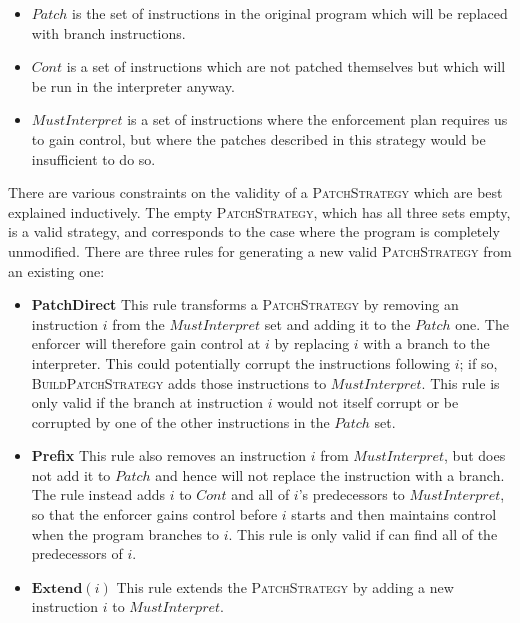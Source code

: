\begin{itemize}
\item $\mathit{Patch}$ is the set of instructions in the original
  program which will be replaced with branch instructions.
\item $\mathit{Cont}$ is a set of instructions which are not patched
  themselves but which will be run in the interpreter anyway.
\item $\mathit{MustInterpret}$ is a set of instructions where the
  enforcement plan requires us to gain control, but where the patches
  described in this strategy would be insufficient to do so.
\end{itemize}

There are various constraints on the validity of a
\textsc{PatchStrategy} which are best explained inductively.  The
empty \textsc{PatchStrategy}, which has all three sets empty, is a
valid strategy, and corresponds to the case where the program is
completely unmodified.  There are three rules for generating a new
valid \textsc{PatchStrategy} from an existing one:

\begin{itemize}
\item
  \textbf{PatchDirect} This rule transforms a \textsc{PatchStrategy}
  by removing an instruction $i$ from the $\mathit{MustInterpret}$ set
  and adding it to the $\mathit{Patch}$ one.  The enforcer will
  therefore gain control at $i$ by replacing $i$ with a branch to the
  interpreter.  This could potentially corrupt the instructions
  following $i$; if so, \textsc{BuildPatchStrategy} adds those
  instructions to $\mathit{MustInterpret}$.  This rule is only valid
  if the branch at instruction $i$ would not itself corrupt or be
  corrupted by one of the other instructions in the $\mathit{Patch}$
  set.
\item
  \textbf{Prefix} This rule also removes an instruction $i$ from
  $\mathit{MustInterpret}$, but does not add it to $\mathit{Patch}$
  and hence will not replace the instruction with a branch.  The rule
  instead adds $i$ to $\mathit{Cont}$ and all of $i$'s predecessors to
  $\mathit{MustInterpret}$, so that the enforcer gains control before
  $i$ starts and then maintains control when the program branches to
  $i$.  This rule is only valid if {\technique} can find all of the
  predecessors of $i$.
\item
  $\textbf{Extend}(i)$ This rule extends the \textsc{PatchStrategy} by
  adding a new instruction $i$ to $\mathit{MustInterpret}$.
\end{itemize}

